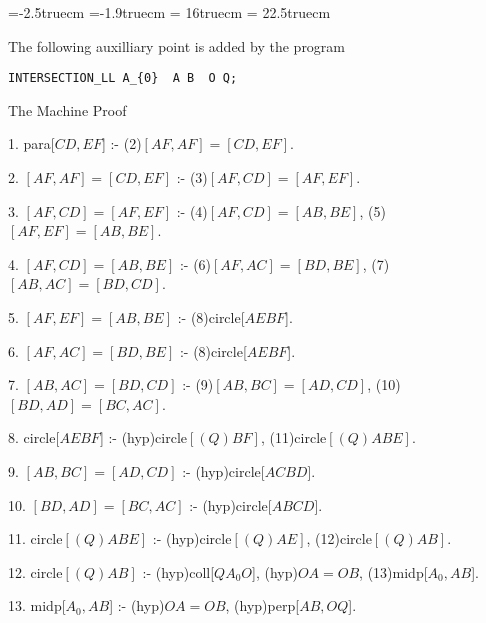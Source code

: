 \voffset=-2.5truecm
\hoffset=-1.9truecm
\textwidth = 16truecm
\textheight = 22.5truecm
\parskip=8pt
\parindent=15pt
\def\fa#1#2{\langle{#1},{#2}\rangle}

The following auxilliary point is added by the program

\begin{verbatim}
INTERSECTION_LL A_{0}  A B  O Q;
\end{verbatim}


{\vskip6pt \parskip=6pt \parindent=10pt 
The Machine Proof


1. para[$CD,EF$] :- (2)$[AF,AF]=[CD,EF]$.

2. $[AF,AF]=[CD,EF]$ :- (3)$[AF,CD]=[AF,EF]$.

3. $[AF,CD]=[AF,EF]$ :- (4)$[AF,CD]=[AB,BE]$, (5)$[AF,EF]=[AB,BE]$.

4. $[AF,CD]=[AB,BE]$ :- (6)$[AF,AC]=[BD,BE]$, (7)$[AB,AC]=[BD,CD]$.

5. $[AF,EF]=[AB,BE]$ :- (8)circle[$AEBF$].

6. $[AF,AC]=[BD,BE]$ :- (8)circle[$AEBF$].

7. $[AB,AC]=[BD,CD]$ :- (9)$[AB,BC]=[AD,CD]$, (10)$[BD,AD]=[BC,AC]$.

8. circle[$AEBF$] :- (hyp)circle$[(Q)BF]$, (11)circle$[(Q)ABE]$.

9. $[AB,BC]=[AD,CD]$ :- (hyp)circle[$ACBD$].

10. $[BD,AD]=[BC,AC]$ :- (hyp)circle[$ABCD$].

11. circle$[(Q)ABE]$ :- (hyp)circle$[(Q)AE]$, (12)circle$[(Q)AB]$.

12. circle$[(Q)AB]$ :- (hyp)coll[$QA_{0}O$], (hyp)$OA = OB$, (13)midp[$A_{0},AB$].

13. midp[$A_{0},AB$] :- (hyp)$OA = OB$, (hyp)perp[$AB,OQ$].
}

